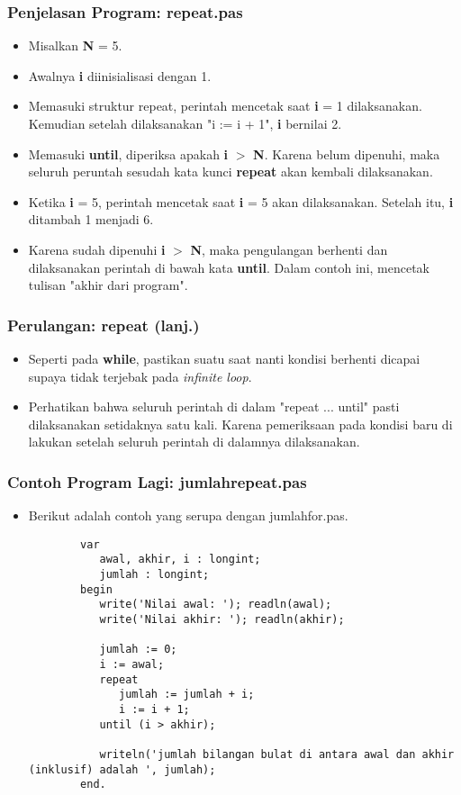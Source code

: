 \documentclass{beamer}
\begin{document}
\begin{frame}
\frametitle{Penjelasan Program: repeat.pas}
\begin{itemize}
	\item Misalkan \textbf{N} = 5.
	\item Awalnya \textbf{i} diinisialisasi dengan 1.
	\item Memasuki struktur repeat, perintah mencetak saat \textbf{i} = 1 dilaksanakan. Kemudian setelah dilaksanakan "i := i + 1", \textbf{i} bernilai 2.
	\item Memasuki \textbf{until}, diperiksa apakah \textbf{i} $>$ \textbf{N}. Karena belum dipenuhi, maka seluruh peruntah sesudah kata kunci \textbf{repeat} akan kembali dilaksanakan.
	\item Ketika \textbf{i} = 5, perintah mencetak saat \textbf{i} = 5 akan dilaksanakan. Setelah itu, \textbf{i} ditambah 1 menjadi 6.
	\item Karena sudah dipenuhi \textbf{i} $>$ \textbf{N}, maka pengulangan berhenti dan dilaksanakan perintah di bawah kata \textbf{until}. Dalam contoh ini, mencetak tulisan "akhir dari program".
\end{itemize}
\end{frame}

\begin{frame}
\frametitle{Perulangan: repeat (lanj.)}
\begin{itemize}
	\item Seperti pada \textbf{while}, pastikan suatu saat nanti kondisi berhenti dicapai supaya tidak terjebak pada \textit{infinite loop}.
	\item Perhatikan bahwa seluruh perintah di dalam "repeat ... until" \alert{pasti} dilaksanakan setidaknya satu kali. Karena pemeriksaan pada kondisi baru di lakukan setelah seluruh perintah di dalamnya dilaksanakan. 
\end{itemize}
\end{frame}

\begin{frame}[fragile]
\frametitle{Contoh Program Lagi: jumlahrepeat.pas}
\begin{itemize}
	\item Berikut adalah contoh yang serupa dengan jumlahfor.pas.
	\begin{lstlisting}
		var
		   awal, akhir, i : longint;
		   jumlah : longint;
		begin
		   write('Nilai awal: '); readln(awal);
		   write('Nilai akhir: '); readln(akhir);
		
		   jumlah := 0;
		   i := awal;
		   repeat
		      jumlah := jumlah + i;
		      i := i + 1;
		   until (i > akhir);
		
		   writeln('jumlah bilangan bulat di antara awal dan akhir (inklusif) adalah ', jumlah);
		end.
	\end{lstlisting}
\end{itemize}
\end{frame}
\end{document}
